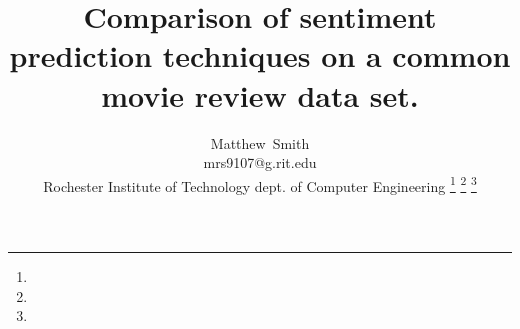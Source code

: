 \documentclass[journal]{IEEEtran}
\begin{document}
%
\title{Comparison of sentiment prediction techniques on a common movie review data set.
}
%
%
%

\author{Matthew~Smith \\
mrs9107@g.rit.edu \\ 
Rochester Institute of Technology dept. of Computer Engineering
\thanks{}%
\thanks{}%
\thanks{}}

% 
%



% 
\end{document}
